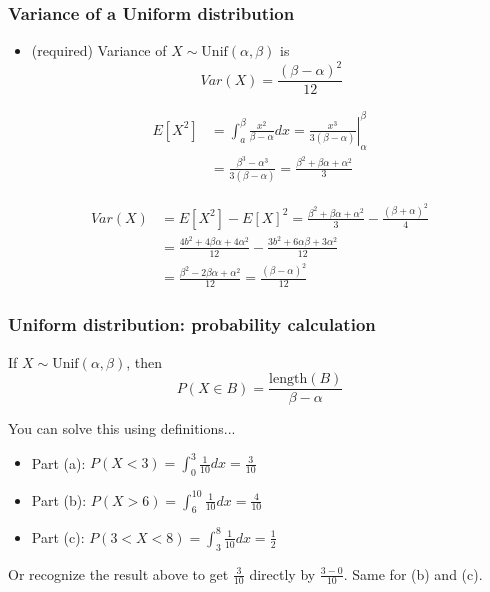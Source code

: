 \documentclass[slidestop,compress,mathserif]{beamer}
\begin{document}

\begin{frame}\frametitle{Variance of a Uniform distribution}
\begin{itemize}
\item ({\color{red}required})  Variance of $X\sim \text{Unif}(\alpha, \beta)$ is
\[ Var(X)   = \frac{(\beta - \alpha)^2}{12} \]
\end{itemize}


\vspace{-0.7cm}
\begin{align*}
E[X^2] &= \int_a^\beta \frac{x^2}{\beta-\alpha} dx
        = \left. \frac{x^3}{3(\beta-\alpha)} \right|_\alpha^\beta \\
       &= \frac{\beta^3-\alpha^3}{3(\beta-\alpha)} = \frac{\beta^2+\beta \alpha+\alpha^2}{3}
\end{align*}

\begin{align*}
Var(X) &= E[X^2]-E[X]^2 = \frac{\beta^2+\beta \alpha+\alpha^2}{3} - \frac{(\beta+\alpha)^2}{4} \\
       &= \frac{4b^2+4 \beta \alpha+4 \alpha^2}{12} - \frac{3b^2+6 \alpha \beta+3 \alpha^2}{12} \\
       & = \frac{\beta^2-2 \beta \alpha +\alpha^2}{12}
        = \frac{(\beta-\alpha)^2}{12}
\end{align*}



\end{frame}
\begin{frame}\frametitle{Uniform distribution: probability calculation}

If $X \sim \text{Unif}(\alpha, \beta)$, then
\vspace{-0.8cm}
\[
P(X \in B) = \frac{\text{length}(B)}{\beta - \alpha}
\]



\pause
You can solve this using definitions...
\begin{itemize}
\item Part (a): $P(X < 3) = \int_0^3 \frac{1}{10}dx = \frac{3}{10}$

\item Part (b): $P(X > 6) = \int_6^10 \frac{1}{10}dx = \frac{4}{10}$

\item Part (c): $P(3 < X < 8) = \int_3^8 \frac{1}{10}dx = \frac{1}{2}$
\end{itemize}
\pause

Or recognize the result above to get $\frac{3}{10}$ directly by $\frac{3 - 0}{10}$. Same for (b) and (c).
\end{frame}
\end{document}
